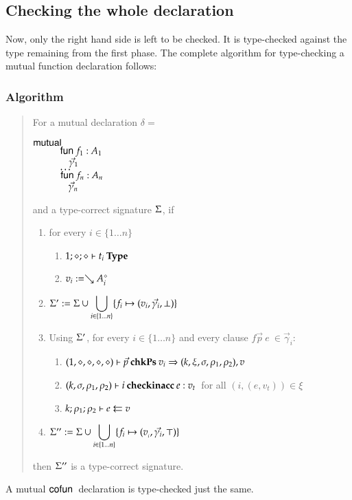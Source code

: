 
\subsection{Checking the whole declaration}

Now, only the right hand side is left to be checked. It is type-checked against the type remaining from the first phase. 
The complete algorithm for type-checking a mutual function declaration follows: 
\subsubsection{Algorithm}
\begin{quote}
For a mutual declaration $\delta = $ 
\begin{bsp}
$\mutual$\\
$\spcx \fun f_1 : A_1 $\\
$\spcx \spc \vec{\gamma}_1$\\
$\spcx \ldots$\\
$\spcx \fun f_n : A_n $\\
$\spcx \spc \vec{\gamma}_n$
\end{bsp}
and a type-correct signature $\Sig$, if 
\begin{enumerate}
\item
for every $i \in \{1 \ldots n \} $
\begin{enumerate}
\item
$\IsType{1}{\diamond}{\diamond}{t_i}$
\item
$v_{i} := \wh \cl{A_i}{\diamond}$
\end{enumerate}
\item
$\Sig' := \Sig \cup \displaystyle\bigcup_{i \in \{1 \ldots n\}}\{f_i \mapsto (v_{i},\vec{\gamma}_i,\bot)\}$
\item
Using $\Sig'$, for every $i \in \{ 1 \ldots n \} $ and every clause  $ f \vec{p} \: e \: \in \vec{\gamma}_i$:
\begin{enumerate}
\item
$\checkps{1,\diamond,\diamond,\diamond,\diamond}{\vec{p}}{v_i}{k,\xi,\sigma,\rho_1,\rho_2}{v}$
\item
$\checkinacc{k,\sigma,\rho_1,\rho_2}{i}{e}{v_t}\: $ for all $(i,(e,v_t)) \in \xi$ 
\item 
$\Check{k}{\rho_1}{\rho_2}{e}{v}$
\end{enumerate}
\item
$\Sig'' := \Sig \cup \displaystyle\bigcup_{i \in \{1 \ldots n\}} \{f_i \mapsto (v_{_i},\vec{\gamma_i},\top)\}$
\end{enumerate}
then $\Sig''$ is a type-correct signature.
\end{quote}
A mutual $\cofun$ declaration is type-checked just the same.

